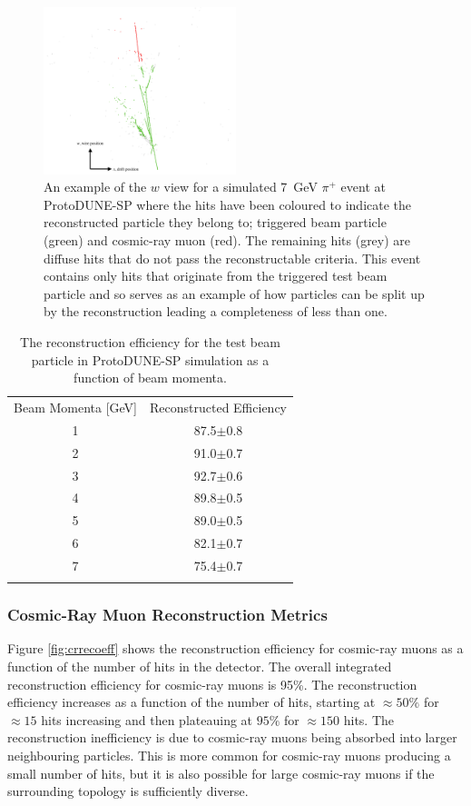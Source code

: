 \begin{figure}
\centering
\includegraphics[width=0.5\textwidth]{Figures/EventDisplays/MC/CompletenessFigure.pdf}
\caption{An example of the $w$ view for a simulated 7~GeV $\pi^{+}$ event at ProtoDUNE-SP where the hits have been coloured to indicate the reconstructed particle they belong to; triggered beam particle (green) and cosmic-ray muon (red).  The remaining hits (grey) are diffuse hits that do not pass the reconstructable criteria.  This event contains only hits that originate from the triggered test beam particle and so serves as an example of how particles can be split up by the reconstruction leading a completeness of less than one.}
\label{fig:completenessfig}
\end{figure}

\begin{table}
\centering
\caption{The reconstruction efficiency for the test beam particle in ProtoDUNE-SP simulation as a function of beam momenta.}
\label{tab:1} 
\begin{tabular}{cc}
\hline\noalign{\smallskip}
Beam Momenta [GeV] & Reconstructed Efficiency  \\
\noalign{\smallskip}\hline\noalign{\smallskip}
1 & 87.5$\pm$0.8 \\
2 & 91.0$\pm$0.7 \\
3 & 92.7$\pm$0.6 \\
4 & 89.8$\pm$0.5 \\
5 & 89.0$\pm$0.5 \\
6 & 82.1$\pm$0.7 \\
7 & 75.4$\pm$0.7 \\
\noalign{\smallskip}\hline
\end{tabular}
\end{table}

\subsubsection{Cosmic-Ray Muon Reconstruction Metrics}
\label{sec:crmetrics}
Figure \ref{fig:crrecoeff} shows the reconstruction efficiency for cosmic-ray muons as a function of the number of hits in the detector.  The overall integrated reconstruction efficiency for cosmic-ray muons is 95\%.  The reconstruction efficiency increases as a function of the number of hits, starting at $\approx 50\%$ for $\approx 15$ hits increasing and then plateauing at $95\%$ for $\approx 150$ hits.  The reconstruction inefficiency is due to cosmic-ray muons being absorbed into larger neighbouring particles.  This is more common for cosmic-ray muons producing a small number of hits, but it is also possible for large cosmic-ray muons if the surrounding topology is sufficiently diverse.

